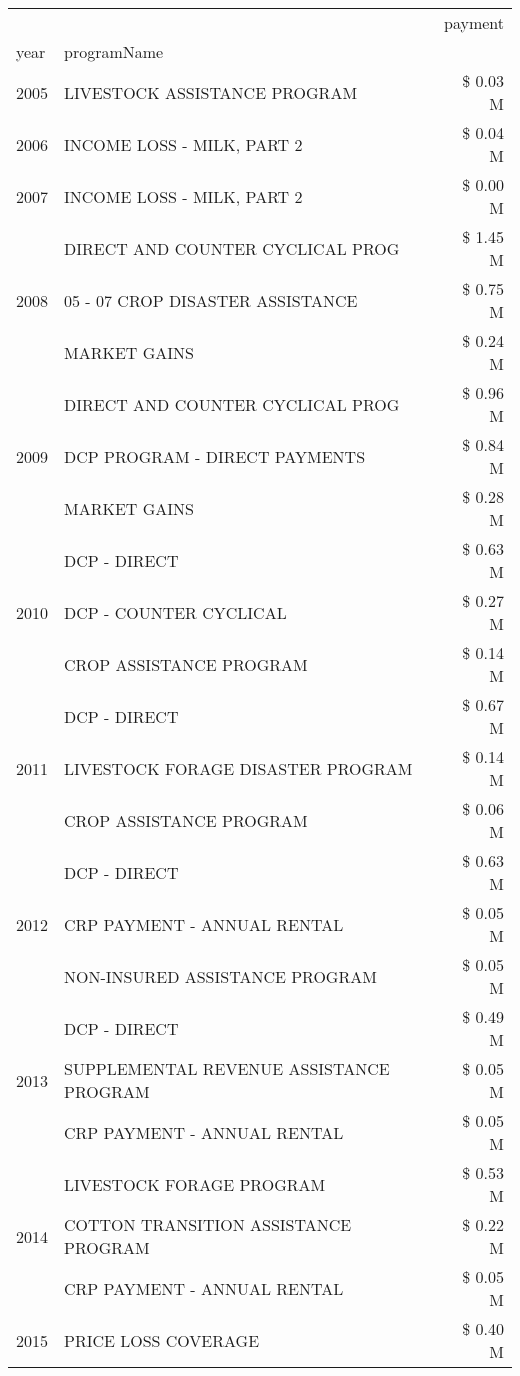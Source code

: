 \begin{tabular}{llr}
\toprule
 &  & payment \\
year & programName &  \\
\midrule
2005 & LIVESTOCK ASSISTANCE PROGRAM & \$ 0.03 M \\
\cline{1-3}
2006 & INCOME LOSS - MILK, PART 2 & \$ 0.04 M \\
\cline{1-3}
2007 & INCOME LOSS - MILK, PART 2 & \$ 0.00 M \\
\cline{1-3}
\multirow[t]{3}{*}{2008} & DIRECT AND COUNTER CYCLICAL PROG & \$ 1.45 M \\
 & 05 - 07 CROP DISASTER ASSISTANCE & \$ 0.75 M \\
 & MARKET GAINS & \$ 0.24 M \\
\cline{1-3}
\multirow[t]{3}{*}{2009} & DIRECT AND COUNTER CYCLICAL PROG & \$ 0.96 M \\
 & DCP PROGRAM - DIRECT PAYMENTS & \$ 0.84 M \\
 & MARKET GAINS & \$ 0.28 M \\
\cline{1-3}
\multirow[t]{3}{*}{2010} & DCP - DIRECT & \$ 0.63 M \\
 & DCP - COUNTER CYCLICAL & \$ 0.27 M \\
 & CROP ASSISTANCE PROGRAM & \$ 0.14 M \\
\cline{1-3}
\multirow[t]{3}{*}{2011} & DCP - DIRECT & \$ 0.67 M \\
 & LIVESTOCK FORAGE DISASTER PROGRAM & \$ 0.14 M \\
 & CROP ASSISTANCE PROGRAM & \$ 0.06 M \\
\cline{1-3}
\multirow[t]{3}{*}{2012} & DCP - DIRECT & \$ 0.63 M \\
 & CRP PAYMENT - ANNUAL RENTAL & \$ 0.05 M \\
 & NON-INSURED ASSISTANCE PROGRAM & \$ 0.05 M \\
\cline{1-3}
\multirow[t]{3}{*}{2013} & DCP - DIRECT & \$ 0.49 M \\
 & SUPPLEMENTAL REVENUE ASSISTANCE PROGRAM & \$ 0.05 M \\
 & CRP PAYMENT - ANNUAL RENTAL & \$ 0.05 M \\
\cline{1-3}
\multirow[t]{3}{*}{2014} & LIVESTOCK FORAGE PROGRAM & \$ 0.53 M \\
 & COTTON TRANSITION ASSISTANCE PROGRAM & \$ 0.22 M \\
 & CRP PAYMENT - ANNUAL RENTAL & \$ 0.05 M \\
\cline{1-3}
\multirow[t]{3}{*}{2015} & PRICE LOSS COVERAGE & \$ 0.40 M \\

\end{tabular}
